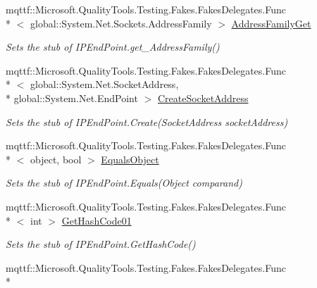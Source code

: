 \begin{DoxyCompactItemize}
\item 
mqttf\-::\-Microsoft.\-Quality\-Tools.\-Testing.\-Fakes.\-Fakes\-Delegates.\-Func\\*
$<$ global\-::\-System.\-Net.\-Sockets.\-Address\-Family $>$ \hyperlink{class_system_1_1_net_1_1_fakes_1_1_stub_i_p_end_point_a89c1b691bdd9c811096845efa23c367c}{Address\-Family\-Get}
\begin{DoxyCompactList}\small\item\em Sets the stub of I\-P\-End\-Point.\-get\-\_\-\-Address\-Family()\end{DoxyCompactList}\item 
mqttf\-::\-Microsoft.\-Quality\-Tools.\-Testing.\-Fakes.\-Fakes\-Delegates.\-Func\\*
$<$ global\-::\-System.\-Net.\-Socket\-Address, \\*
global\-::\-System.\-Net.\-End\-Point $>$ \hyperlink{class_system_1_1_net_1_1_fakes_1_1_stub_i_p_end_point_ac67fd199f9b3d7da0b0da46a476d8c07}{Create\-Socket\-Address}
\begin{DoxyCompactList}\small\item\em Sets the stub of I\-P\-End\-Point.\-Create(\-Socket\-Address socket\-Address)\end{DoxyCompactList}\item 
mqttf\-::\-Microsoft.\-Quality\-Tools.\-Testing.\-Fakes.\-Fakes\-Delegates.\-Func\\*
$<$ object, bool $>$ \hyperlink{class_system_1_1_net_1_1_fakes_1_1_stub_i_p_end_point_ab926c3be56433fc5f247ca8067e62088}{Equals\-Object}
\begin{DoxyCompactList}\small\item\em Sets the stub of I\-P\-End\-Point.\-Equals(\-Object comparand)\end{DoxyCompactList}\item 
mqttf\-::\-Microsoft.\-Quality\-Tools.\-Testing.\-Fakes.\-Fakes\-Delegates.\-Func\\*
$<$ int $>$ \hyperlink{class_system_1_1_net_1_1_fakes_1_1_stub_i_p_end_point_a17f0f6b869f605403f4b4ff68b39dae9}{Get\-Hash\-Code01}
\begin{DoxyCompactList}\small\item\em Sets the stub of I\-P\-End\-Point.\-Get\-Hash\-Code()\end{DoxyCompactList}\item 
mqttf\-::\-Microsoft.\-Quality\-Tools.\-Testing.\-Fakes.\-Fakes\-Delegates.\-Func\\*

\end{DoxyCompactItemize}
